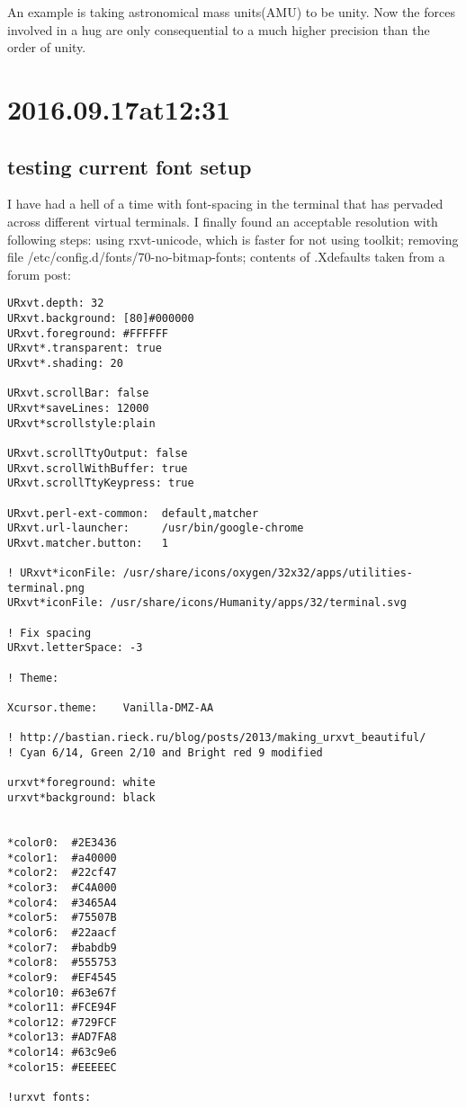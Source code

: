 \begin{enumerate}
\begin{enumerate}
An example is taking astronomical mass units(AMU) to be unity. Now the forces involved in a hug are only consequential to a much higher precision than the order of unity.

\section*{ 2016.09.17at12:31 }
\subsection*{ testing current font setup }
I have had a hell of a time with font-spacing in the terminal that has pervaded across different virtual terminals. I finally found an acceptable resolution with following steps:
using rxvt-unicode, which is faster for not using toolkit;
removing file /etc/config.d/fonts/70-no-bitmap-fonts;
contents of .Xdefaults taken from a forum post:

\begin{lstlisting}
URxvt.depth: 32
URxvt.background: [80]#000000
URxvt.foreground: #FFFFFF
URxvt*.transparent: true
URxvt*.shading: 20

URxvt.scrollBar: false
URxvt*saveLines: 12000
URxvt*scrollstyle:plain

URxvt.scrollTtyOutput: false
URxvt.scrollWithBuffer: true
URxvt.scrollTtyKeypress: true

URxvt.perl-ext-common:  default,matcher
URxvt.url-launcher:     /usr/bin/google-chrome
URxvt.matcher.button:   1

! URxvt*iconFile: /usr/share/icons/oxygen/32x32/apps/utilities-terminal.png
URxvt*iconFile: /usr/share/icons/Humanity/apps/32/terminal.svg

! Fix spacing
URxvt.letterSpace: -3

! Theme:

Xcursor.theme:    Vanilla-DMZ-AA

! http://bastian.rieck.ru/blog/posts/2013/making_urxvt_beautiful/
! Cyan 6/14, Green 2/10 and Bright red 9 modified

urxvt*foreground: white
urxvt*background: black


*color0:  #2E3436
*color1:  #a40000
*color2:  #22cf47
*color3:  #C4A000
*color4:  #3465A4
*color5:  #75507B
*color6:  #22aacf
*color7:  #babdb9
*color8:  #555753
*color9:  #EF4545
*color10: #63e67f
*color11: #FCE94F
*color12: #729FCF
*color13: #AD7FA8
*color14: #63c9e6
*color15: #EEEEEC

!urxvt fonts: 


\end{lstlisting}
\end{enumerate}
\end{enumerate}
